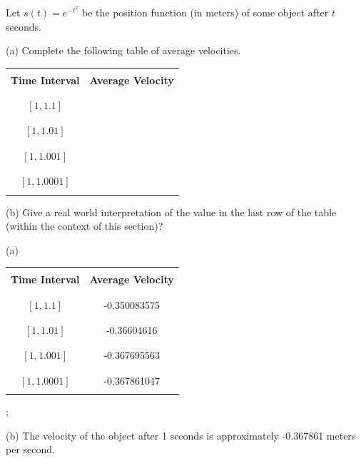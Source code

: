 {Let $s(t) = e^{-t^2}$ be the position function (in meters) of some object after $t$ seconds.  

(a) Complete the following table of average velocities.
\begin{center}
	\setlength{\extrarowheight}{-0.3cm}
	\begin{tabular}{| c | c |}
		\hline
		&\\
		{\bf Time Interval} & {\bf Average Velocity}\\
		&\\
		\hline
		&\\
		$[1,1.1]$&\\
		&\\
		\hline
		&\\
		$[1,1.01]$&\\
		&\\
		\hline
		&\\
		$[1,1.001]$&\\
		&\\
		\hline
		&\\
		$[1,1.0001]$&\\
		&\\
		\hline
	\end{tabular}
\end{center}
(b) Give a real world interpretation of the value in the last row of the table (within the context of this section)?
}
{(a)

	\setlength{\extrarowheight}{-0.3cm}
	\begin{tabular}{| c | c |}
		\hline
		&\\
		{\bf Time Interval} & {\bf Average Velocity}\\
		&\\
		\hline
		&\\
		$[1,1.1]$&-0.350083575\\
		&\\
		\hline
		&\\
		$[1,1.01]$&-0.36604616\\
		&\\
		\hline
		&\\
		$[1,1.001]$&-0.367695563\\
		&\\
		\hline
		&\\
		$[1,1.0001]$&-0.367861047\\
		&\\
		\hline
	\end{tabular};
	
(b) The velocity of the object after 1 seconds is approximately -0.367861 meters per second.
}